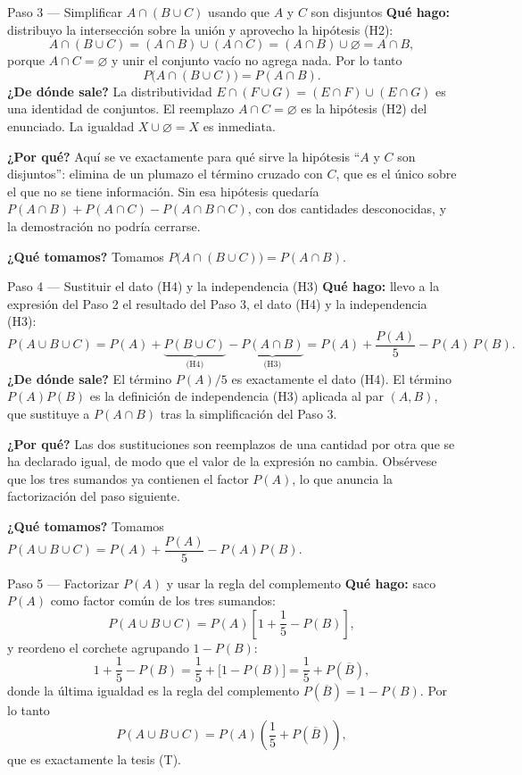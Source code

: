 \documentclass[11pt]{article}
\begin{document}
\begin{sol}
\begin{paso}{Paso 3 --- Simplificar $A\cap(B\cup C)$ usando que $A$ y $C$ son disjuntos}
\textbf{Qué hago:} distribuyo la intersección sobre la unión y aprovecho la hipótesis (H2):
\[
A\cap(B\cup C)=(A\cap B)\cup(A\cap C)=(A\cap B)\cup\varnothing=A\cap B,
\]
porque $A\cap C=\varnothing$ y unir el conjunto vacío no agrega nada. Por lo tanto
\[
P\bigl(A\cap(B\cup C)\bigr)=P(A\cap B).
\]
\textbf{¿De dónde sale?} La distributividad $E\cap(F\cup G)=(E\cap F)\cup(E\cap G)$ es una
identidad de conjuntos. El reemplazo $A\cap C=\varnothing$ es la hipótesis (H2) del enunciado.
La igualdad $X\cup\varnothing=X$ es inmediata.

\textbf{¿Por qué?} Aquí se ve exactamente para qué sirve la hipótesis ``$A$ y $C$ son
disjuntos'': elimina de un plumazo el término cruzado con $C$, que es el único sobre el que no
se tiene información. Sin esa hipótesis quedaría $P(A\cap B)+P(A\cap C)-P(A\cap B\cap C)$, con
dos cantidades desconocidas, y la demostración no podría cerrarse.

\textbf{¿Qué tomamos?} Tomamos $P\bigl(A\cap(B\cup C)\bigr)=P(A\cap B)$.
\end{paso}

\begin{paso}{Paso 4 --- Sustituir el dato (H4) y la independencia (H3)}
\textbf{Qué hago:} llevo a la expresión del Paso 2 el resultado del Paso 3, el dato (H4) y la
independencia (H3):
\[
P(A\cup B\cup C)=P(A)+\underbrace{P(B\cup C)}_{\text{(H4)}}-\underbrace{P(A\cap B)}_{\text{(H3)}}
=P(A)+\frac{P(A)}{5}-P(A)\,P(B).
\]
\textbf{¿De dónde sale?} El término $P(A)/5$ es exactamente el dato (H4). El término
$P(A)P(B)$ es la definición de independencia (H3) aplicada al par $(A,B)$, que sustituye a
$P(A\cap B)$ tras la simplificación del Paso 3.

\textbf{¿Por qué?} Las dos sustituciones son reemplazos de una cantidad por otra que se ha
declarado igual, de modo que el valor de la expresión no cambia. Obsérvese que los tres
sumandos ya contienen el factor $P(A)$, lo que anuncia la factorización del paso siguiente.

\textbf{¿Qué tomamos?} Tomamos $P(A\cup B\cup C)=P(A)+\dfrac{P(A)}{5}-P(A)P(B)$.
\end{paso}

\begin{paso}{Paso 5 --- Factorizar $P(A)$ y usar la regla del complemento}
\textbf{Qué hago:} saco $P(A)$ como factor común de los tres sumandos:
\[
P(A\cup B\cup C)=P(A)\left[1+\frac{1}{5}-P(B)\right],
\]
y reordeno el corchete agrupando $1-P(B)$:
\[
1+\frac{1}{5}-P(B)=\frac{1}{5}+\bigl[1-P(B)\bigr]=\frac{1}{5}+P(\overline{B}),
\]
donde la última igualdad es la regla del complemento $P(\overline{B})=1-P(B)$. Por lo tanto
\[
P(A\cup B\cup C)=P(A)\left(\frac{1}{5}+P(\overline{B})\right),
\]
que es exactamente la tesis (T).


\end{paso}
\end{sol}
\end{document}
